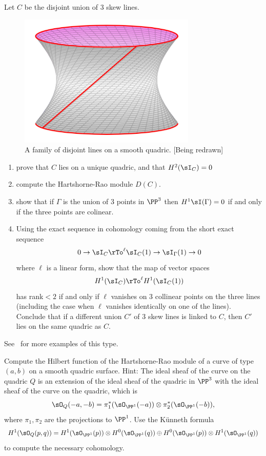 \begin{exercise}
Let $C$ be the disjoint union of 3 skew lines. 

\begin{figure}
\inprogress
\centerline {\includegraphics[height=2.5in]{"main/Fig15-2-SinglyRuledHyperboloid"}}
\caption{A family of disjoint lines on a smooth quadric. [Being redrawn]}
\label{Fig15.2}
\end{figure}

\begin{enumerate}
 \item prove that $C$ lies on a unique quadric, and that $H^2(\sI_C) = 0$
 \item compute the Hartshorne-Rao module $D(C)$.
 \item show that if $\Gamma$ is the union of 3 points in $\PP^3$ then
 $H^1\sI(\Gamma) = 0$ if and only if the three points are colinear.
 \item Using the exact sequence in cohomology coming from the short exact sequence
$$
0\to \sI_C \rTo^{\ell} \sI_C(1) \to \sI_\Gamma(1) \to 0
$$
where $\ell$ is a linear form, show that the map of vector spaces
$$
H^1(\sI_C) \rTo^{\ell} H^1(\sI_C(1))
$$
has rank$<2$ if and only if $\ell$ vanishes on 3 collinear points on the three lines (including the case when $\ell$ vanishes identically on one of the lines).
Conclude that if a different union $C'$ of 3 skew lines is linked to $C$, then $C'$ lies on the same quadric as $C$.
\end{enumerate}
See~\cite{Migliore} for more examples of this type.
\end{exercise}

\begin{exercise}
 Compute the Hilbert function of the Hartshorne-Rao module of a curve of type $(a,b)$ on a smooth quadric surface.
 Hint: The ideal sheaf of the curve on the quadric $Q$ is an extension of the ideal sheaf of the quadric in $\PP^3$
 with the ideal sheaf of the curve on the quadric, which is 
 $$
 \sO_Q(-a,-b) = \pi_1^*(\sO_{\PP^1}(-a)) \otimes \pi_2^*(\sO_{\PP^1}(-b)),
 $$
 where $\pi_1, \pi_2$ are the projections to $\PP^1$. Use the K\"unneth formula
 $$
 H^1(\sO_Q(p,q)) = H^1(\sO_{\PP^1}(p)) \otimes H^0(\sO_{\PP^1}(q)) \oplus
  H^0(\sO_{\PP^1}(p)) \otimes H^1(\sO_{\PP^1}(q))
 $$
  to compute the necessary cohomology.
\end{exercise}

